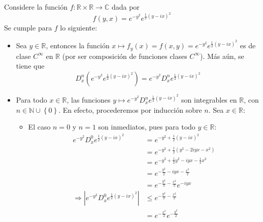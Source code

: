 \documentclass[12pt]{report}
\theoremstyle{largebreak}
\renewcommand{\leq}{\ensuremath{\leqslant}}
\newcommand\abs[1]{\ensuremath{\left|#1\right|}}
\newcommand\cf[3]{\ensuremath{#1:#2\rightarrow#3}}
\begin{document}
    \begin{sol}
        Considere la función $\cf{f}{\mathbb{R}\times\mathbb{R}}{\mathbb{C}}$ dada por
        \begin{equation*}
            f(y,x)=e^{-y^2}e^{\frac{1}{2}\left(y-ix \right)^2}
        \end{equation*}
        Se cumple para $f$ lo siguiente:
        \begin{itemize}
            \item Sea $y\in\mathbb{R}$, entonces la función $x\mapsto f_y(x)=f(x,y)=e^{-y^2}e^{\frac{1}{2}\left(y-ix \right)^2}$ es de clase $C^{\infty}$ en $\mathbb{R}$ (por ser composición de funciones clases $C^{\infty}$). Más aún, se tiene que
            \begin{equation*}
                D_x^n\left(e^{-y^2}e^{\frac{1}{2}\left(y-ix \right)^2}\right)=e^{ -y^2}D_x^ne^{\frac{1}{2}\left(y-ix \right)^2}
            \end{equation*}
            \item Para todo $x\in\mathbb{R}$, las funciones $y\mapsto e^{ -y^2}D_x^ne^{\frac{1}{2}\left(y-ix \right)^2}$ son integrables en $\mathbb{R}$, con $n\in\mathbb{N}\cup\left\{0\right\}$. En efecto, procederemos por inducción sobre $n$. Sea $x\in\mathbb{R}$:
            \begin{itemize}
                \item El caso $n=0$ y $n=1$ son inmediatos, pues para todo $y\in\mathbb{R}$:
                \begin{equation*}
                    \begin{split}
                        e^{ -y^2}D_x^0e^{\frac{1}{2}\left(y-ix \right)^2}&=e^{-y^2+\frac{1}{2}\left(y-ix \right)^2}\\
                        &=e^{-y^2 +\frac{1}{2}(y^2-2iyx-x^2)}\\
                        &=e^{-y^2+\frac{1}{2}y^2-iyx-\frac{1}{2}x^2}\\
                        &=e^{-\frac{y^2}{2}-iyx-\frac{x^2}{2}}\\
                        &=e^{-\frac{y^2}{2}-\frac{x^2}{2}}e^{-iyx}\\
                        \Rightarrow \abs{e^{ -y^2}D_x^0e^{\frac{1}{2}\left(y-ix \right)^2}}&\leq e^{-\frac{y^2}{2}-\frac{x^2}{2}}\\
                        &=e^{-\frac{x^2}{2}}e^{-\frac{y^2}{2}}\\
                    \end{split}
                \end{equation*}

\end{itemize}
\end{itemize}
\end{sol}
\end{document}
